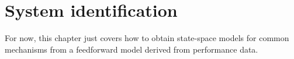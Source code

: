 
\chapter{System identification}

For now, this chapter just covers how to obtain state-space models for common
mechanisms from a feedforward model derived from performance data.

\renewcommand*{\chapterpath}{\partpath/system-identification}




